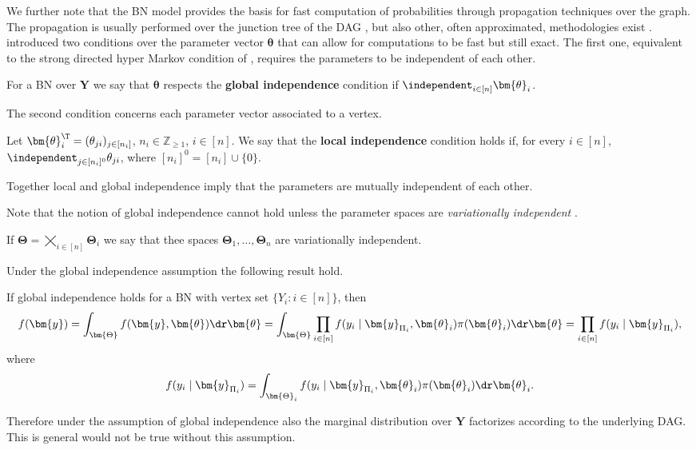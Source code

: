 We further note that the \gls{BN} model provides the basis for fast computation of probabilities through propagation techniques over the graph. The propagation is usually performed over the junction tree of the \gls{DAG} \citep[see e.g.][]{Smith2010}, but also other, often approximated, methodologies exist \citep{Murphy1999, Cowell1999a}.  \citet{Spiegelhalter1990} introduced two conditions over the parameter vector $\bm{\theta}$ that can allow for computations to be fast but still exact. The first one, equivalent to the strong directed hyper Markov condition of \citet{Dawid1993}, requires the parameters to be independent of each other. 
\begin{definition}
\label{def:global}
For a \gls{BN} over $\bm{Y}$ we say that $\bm{\theta}$  respects the \textbf{global independence} condition if 
$\independent_{i\in[n]} \bm{\theta}_i$.
\end{definition} 

The second condition concerns each parameter vector associated to a vertex.
\begin{definition}
Let $\bm{\theta}_i^\T=(\theta_{ji})_{j\in[n_i]}$, $n_i\in\mathbb{Z}_{\geq 1}$, $i\in[n]$. We say that the \textbf{local independence} condition holds if, for every $i\in[n]$,
$\independent_{j\in [n_i]^0}\theta_{ji}$, where $[n_i]^0=[n_i]\cup\{0\}$.
\end{definition}
Together local and global independence imply that the parameters are mutually independent of each other.

Note that the notion of global independence cannot hold unless the parameter spaces are \textit{variationally independent} \citep{Dawid2001,Dawid1993}. 
\begin{definition}
\label{def:varind}
 If $\bm{\Theta}=\bigtimes_{i\in[n]}\bm{\Theta}_i$ we say that thee spaces $\bm{\Theta}_1,\dots,\bm{\Theta}_n$ are variationally independent.
\end{definition}

Under the global independence assumption the following result hold.
\begin{proposition}
\label{prop:BNasDDM}
If global independence holds for a \gls{BN} with vertex set $\{Y_i:i\in[n]\}$, then
\begin{equation*}
f(\bm{y})=\int_{\bm{\Theta}}f(\bm{y},\bm{\theta})\dr \bm{\theta}=\int_{\bm{\Theta}}\prod_{i\in[n]}f(y_i\;|\;\bm{y}_{\Pi_i},\bm{\theta}_i)\pi(\bm{\theta}_i)\dr\bm{\theta} =\prod_{i\in[n]}f(y_i\;|\;\bm{y}_{\Pi_i}),
\end{equation*}
where
\begin{equation*}
f(y_i\;|\;\bm{y}_{\Pi_i})=\int_{\bm{\Theta}_i}f(y_i\;|\;\bm{y}_{\Pi_i},\bm{\theta}_i)\pi(\bm{\theta}_i)\dr\bm{\theta}_i.
\end{equation*}
\end{proposition}
Therefore under the assumption of global independence also the marginal distribution over $\bm{Y}$ factorizes according to the underlying \gls{DAG}. This is general would not be true without this assumption.

